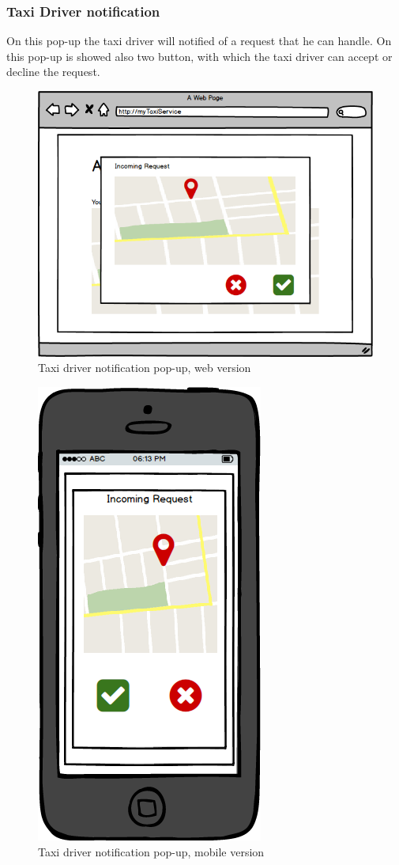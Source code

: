\documentclass{report}
\begin{document}
			
			
			\subsubsection{Taxi Driver notification}
			On this pop-up the taxi driver will notified of a request that he can handle. On this pop-up is showed also two button, with which the taxi driver can accept or decline the request.
			\begin{figure}[H]
			\centering
			\includegraphics[scale=0.5]{IMG/UserInterfaces/notificationTaxiDriver.png}
			\caption{Taxi driver notification pop-up, web version}\label{visina8}
			\end{figure}
			\begin{figure}[H]
			\centering
			\includegraphics[scale=0.4]{IMG/UserInterfaces/notificationTaxiDriver_m.png}
			\caption{Taxi driver notification pop-up, mobile version}\label{visina8}
			\end{figure}
\end{document}
